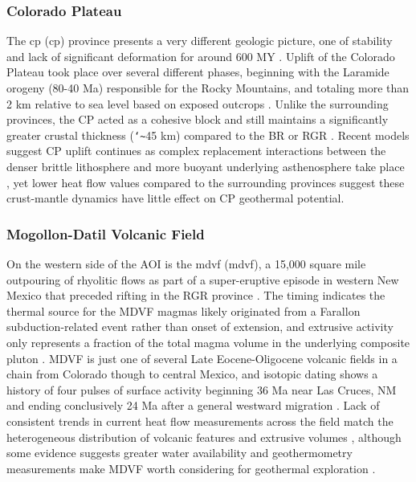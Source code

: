 \subsubsection{Colorado Plateau}

The \acrlong{cp} (\acrshort{cp}) province presents a very different geologic picture, one of stability and lack of significant deformation for around 600 MY \citep{leighty_neogene_1997}. Uplift of the Colorado Plateau took place over several different phases, beginning with the Laramide orogeny (80-40 Ma) responsible for the Rocky Mountains, and totaling more than 2 km relative to sea level based on exposed outcrops \citep{moucha_deep_2009}. Unlike the surrounding provinces, the CP acted as a cohesive block and still maintains a significantly greater crustal thickness (\texttt{\char`\~}45 km) compared to the BR or RGR \citep{wilson_imaging_2005}. Recent models suggest CP uplift continues as complex replacement interactions between the denser brittle lithosphere and more buoyant underlying asthenosphere take place \citep{levander_continuing_2011}, yet lower heat flow values compared to the surrounding provinces \citep{thompson_regional_1979} suggest these crust-mantle dynamics have little effect on CP geothermal potential.

\subsubsection{Mogollon-Datil Volcanic Field}

On the western side of the AOI is the \acrlong{mdvf} (\acrshort{mdvf}), a 15,000 square mile outpouring of rhyolitic flows as part of a super-eruptive episode in western New Mexico that preceded rifting in the RGR province \citep{keller_rio_1999}. The timing indicates the thermal source for the MDVF magmas likely originated from a Farallon subduction-related event rather than onset of extension, and extrusive activity only represents a fraction of the total magma volume in the underlying composite pluton \citep{olsen_rio_1987,schneider_crustal_1994}. MDVF is just one of several Late Eocene-Oligocene volcanic fields in a chain from Colorado though to central Mexico, and isotopic dating shows a history of four pulses of surface activity beginning 36 Ma near Las Cruces, NM and ending conclusively 24 Ma after a general westward migration \citep{mcintosh_time-stratigraphic_1992}. Lack of consistent trends in current heat flow measurements across the field match the heterogeneous distribution of volcanic features and extrusive volumes \citep{mcintosh_time-stratigraphic_1992}, although some evidence suggests greater water availability and geothermometry measurements make MDVF worth considering for geothermal exploration \citep{pepin_new_2018}.

